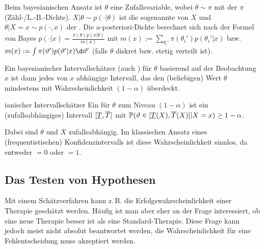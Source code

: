 \linie

\begin{Bem}
    Beim bayesianischen Ansatz ist $\theta$ eine Zufallsvariable,
    wobei $\theta \sim \pi$ mit der  $\pi$ (Zähl-/L.-B.-Dichte).
    $X|\theta \sim p(\cdot|\theta)$ ist die sogenannte  von $X$ und
    $\theta|X=x \sim p(\cdot,x)$ der .
    Die a-posteriori-Dichte berechnet sich nach der Formel von Bayes
    $p(\cdot|x) = \frac{\pi(\theta) p(x|\theta)}{m(x)}$ mit
    $m(x) := \sum_{\theta_i'} \pi(\theta_i') p(\theta_i'|x)$ bzw.
    $m(x) := \int \pi(\theta') p(\theta'|x) \d\theta'$
    (falls $\theta$ diskret bzw. stetig verteilt ist).

    Ein bayesianischer Intervallschätzer (auch ) für $\theta$
    basierend auf der Beobachtung $x$ ist dann jedes von $x$ abhängige Intervall, das den
    (beliebigen) Wert $\theta$ mindestens mit Wahrscheinlichkeit $(1 - \alpha)$ überdeckt.
\end{Bem}

\begin{Def}{ianischer Intervallschätzer}
    Ein  für $\theta$ zum Niveau $(1 - \alpha)$
    ist ein (zufallsabhängiges) Intervall $[\underline{T}, \overline{T}]$ mit
    $\mathbb{P}(\vartheta \in [\underline{T}(X), \overline{T}(X)]|X=x) \ge 1 - \alpha$.
\end{Def}

\begin{Bem}
    Dabei sind $\theta$ und $X$ zufallsabhängig.
    Im klassischen Ansatz eines (frequentistischen) Konfidenzintervalls ist diese
    Wahrscheinlichkeit sinnlos, da entweder $= 0$ oder $= 1$.
\end{Bem}

\pagebreak

\subsection{%
    Das Testen von Hypothesen%
}

\begin{Bem}
    Mit einem Schätzverfahren kann z.\,B. die Erfolgswahrscheinlichkeit
    einer Therapie geschätzt werden.
    Häufig ist man aber eher an der Frage interessiert, ob eine neue Therapie besser ist als
    eine Standard-Therapie.
    Diese Frage kann jedoch meist nicht absolut beantwortet werden, die Wahrscheinlichkeit für eine
    Fehlentscheidung muss akzeptiert werden.
\end{Bem}

